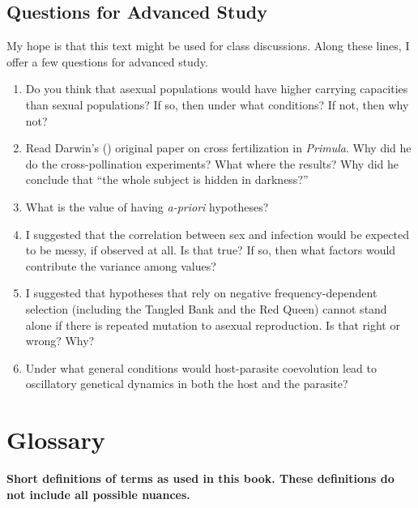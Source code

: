 \documentclass[
  letterpaper,
]{book}
\providecommand{\tightlist}{%
  \setlength{\itemsep}{0pt}\setlength{\parskip}{0pt}}\usepackage{longtable,booktabs,array}
\begin{document}
\section{Questions for Advanced
Study}\label{questions-for-advanced-study}

My hope is that this text might be used for class discussions. Along
these lines, I offer a few questions for advanced study.

\begin{enumerate}
\def\labelenumi{\arabic{enumi}.}
\tightlist
\item
  Do you think that asexual populations would have higher carrying
  capacities than sexual populations? If so, then under what conditions?
  If not, then why not?
\item
  Read Darwin's () original paper on
  cross fertilization in \emph{Primula}. Why did he do the
  cross-pollination experiments? What where the results? Why did he
  conclude that ``the whole subject is hidden in darkness?''\\
\item
  What is the value of having \emph{a-priori} hypotheses?
\item
  I suggested that the correlation between sex and infection would be
  expected to be messy, if observed at all. Is that true? If so, then
  what factors would contribute the variance among values?\\
\item
  I suggested that hypotheses that rely on negative frequency-dependent
  selection (including the Tangled Bank and the Red Queen) cannot stand
  alone if there is repeated mutation to asexual reproduction. Is that
  right or wrong? Why?
\item
  Under what general conditions would host-parasite coevolution lead to
  oscillatory genetical dynamics in both the host and the parasite?
\end{enumerate}


\chapter*{Glossary}\label{sec-glossary}


\textbf{Short definitions of terms as used in this book. These
definitions do not include all possible nuances.}
\end{document}
